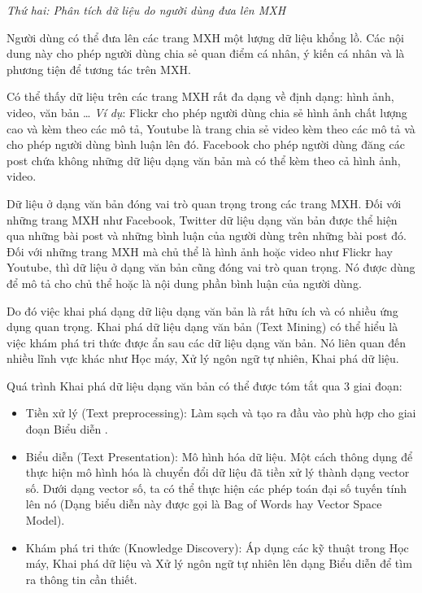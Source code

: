 \documentclass[12pt]{extarticle}
\begin{document}
			\par \textit{Thứ hai: Phân tích dữ liệu do người dùng đưa lên MXH}
			\par Người dùng có thể đưa lên các trang MXH một lượng dữ liệu khổng lồ. Các nội dung này cho phép người dùng chia sẻ quan điểm cá nhân, ý kiến cá nhân và là phương tiện để tương tác trên MXH.
			\par Có thể thấy dữ liệu trên các trang MXH rất đa dạng về định dạng: hình ảnh, video, văn bản … \textit{Ví dụ}: Flickr cho phép người dùng chia sẻ hình ảnh chất lượng cao và kèm theo các mô tả, Youtube là trang chia sẻ video kèm theo các mô tả và cho phép người dùng bình luận lên đó. Facebook cho phép người dùng đăng các post chứa không những dữ liệu dạng văn bản mà có thể kèm theo cả hình ảnh, video.
			\par Dữ liệu ở dạng văn bản đóng vai trò quan trọng trong các trang MXH. Đối với những trang MXH như Facebook, Twitter dữ liệu dạng văn bản được thể hiện qua những bài post và những bình luận của người dùng trên những bài post đó. Đối với những trang MXH mà chủ thể là hình ảnh hoặc video như Flickr hay Youtube, thì dữ liệu ở dạng văn bản cũng đóng vai trò quan trọng. Nó được dùng để mô tả cho chủ thể hoặc là nội dung phần bình luận của người dùng.
			\par Do đó việc khai phá dạng dữ liệu dạng văn bản là rất hữu ích và có nhiều ứng dụng quan trọng. Khai phá dữ liệu dạng văn bản (Text Mining) có thể hiểu là việc khám phá tri thức được ẩn sau các dữ liệu dạng văn bản. Nó liên quan đến nhiều lĩnh vực khác như Học máy, Xử lý ngôn ngữ tự nhiên, Khai phá dữ liệu.
			\par Quá trình Khai phá dữ liệu dạng văn bản có thể được tóm tắt qua 3 giai đoạn:
			\begin{itemize}
				\item Tiền xử lý (Text preprocessing): Làm sạch và tạo ra đầu vào phù hợp cho giai đoạn Biểu diễn .
				\item Biểu diễn (Text Presentation): Mô hình hóa dữ liệu. Một cách thông dụng để thực hiện mô hình hóa là chuyển đổi dữ liệu đã tiền xử lý thành dạng vector số. Dưới dạng vector số, ta có thể thực hiện các phép toán đại số tuyến tính lên nó (Dạng biểu diễn này được gọi là Bag of Words hay Vector Space Model).
				\item Khám phá tri thức (Knowledge Discovery): Áp dụng các kỹ thuật trong Học máy, Khai phá dữ liệu và Xử lý ngôn ngữ tự nhiên lên dạng Biểu diễn để tìm ra thông tin cần thiết.
			\end{itemize}
\end{document}
